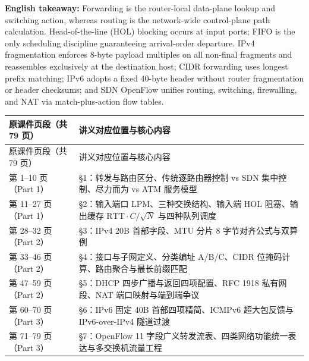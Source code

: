 \textbf{English takeaway:} Forwarding is the router-local data-plane lookup and switching action, whereas routing is the network-wide control-plane path calculation. Head-of-the-line (HOL) blocking occurs at input ports; FIFO is the only scheduling discipline guaranteeing arrival-order departure. IPv4 fragmentation enforces 8-byte payload multiples on all non-final fragments and reassembles exclusively at the destination host; CIDR forwarding uses longest prefix matching; IPv6 adopts a fixed 40-byte header without router fragmentation or header checksums; and SDN OpenFlow unifies routing, switching, firewalling, and NAT via match-plus-action flow tables.



\begingroup\small\setlength{\tabcolsep}{3pt}\renewcommand{\arraystretch}{1.22}
\begin{longtable}{@{}>{\raggedright\arraybackslash}p{}>{\raggedright\arraybackslash}p{}@{}}
\toprule
原课件页段（共 79 页） & 讲义对应位置与核心内容 \\
\midrule\endfirsthead
原课件页段（共 79 页） & 讲义对应位置与核心内容 \\
\midrule\endhead
\bottomrule\endfoot
第 1–10 页（Part 1） & §1：转发与路由区分、传统逐路由器控制 vs SDN 集中控制、尽力而为 vs ATM 服务模型 \\
第 11–27 页（Part 1） & §2：输入端口 LPM、三种交换结构、输入端 HOL 阻塞、输出缓存 $\mathrm{RTT}\cdot C/\sqrt{N}$ 与四种队列调度 \\
第 28–32 页（Part 2） & §3：IPv4 20B 首部字段、MTU 分片 8 字节对齐公式与双算例 \\
第 33–46 页（Part 2） & §4：接口与子网定义、分类编址 A/B/C、CIDR 位掩码计算、路由聚合与最长前缀匹配 \\
第 47–59 页（Part 2） & §5：DHCP 四步广播与返回四项配置、RFC 1918 私有网段、NAT 端口映射与端到端争议 \\
第 60–70 页（Part 3） & §6：IPv6 固定 40B 首部四项精简、ICMPv6 超大包反馈与 IPv6-over-IPv4 隧道过渡 \\
第 71–79 页（Part 3） & §7：OpenFlow 11 字段广义转发流表、四类网络功能统一表达与多交换机流量工程 \\
\end{longtable}\endgroup
